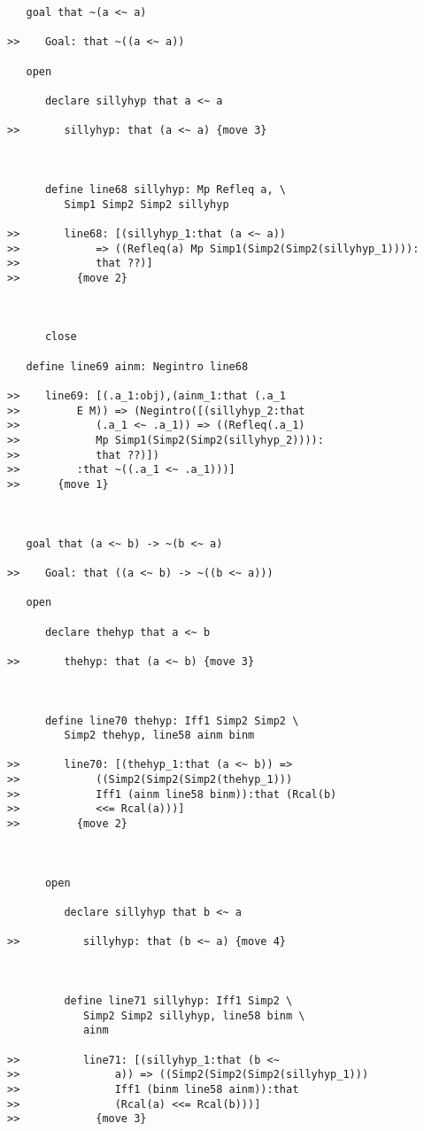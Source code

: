 \documentclass[12pt]{article}
\begin{document}
\begin{verbatim}
   goal that ~(a <~ a)

>>    Goal: that ~((a <~ a))

   open

      declare sillyhyp that a <~ a

>>       sillyhyp: that (a <~ a) {move 3}



      define line68 sillyhyp: Mp Refleq a, \
         Simp1 Simp2 Simp2 sillyhyp

>>       line68: [(sillyhyp_1:that (a <~ a))
>>            => ((Refleq(a) Mp Simp1(Simp2(Simp2(sillyhyp_1)))):
>>            that ??)]
>>         {move 2}



      close

   define line69 ainm: Negintro line68

>>    line69: [(.a_1:obj),(ainm_1:that (.a_1
>>         E M)) => (Negintro([(sillyhyp_2:that
>>            (.a_1 <~ .a_1)) => ((Refleq(.a_1)
>>            Mp Simp1(Simp2(Simp2(sillyhyp_2)))):
>>            that ??)])
>>         :that ~((.a_1 <~ .a_1)))]
>>      {move 1}



   goal that (a <~ b) -> ~(b <~ a)

>>    Goal: that ((a <~ b) -> ~((b <~ a)))

   open

      declare thehyp that a <~ b

>>       thehyp: that (a <~ b) {move 3}



      define line70 thehyp: Iff1 Simp2 Simp2 \
         Simp2 thehyp, line58 ainm binm

>>       line70: [(thehyp_1:that (a <~ b)) =>
>>            ((Simp2(Simp2(Simp2(thehyp_1)))
>>            Iff1 (ainm line58 binm)):that (Rcal(b)
>>            <<= Rcal(a)))]
>>         {move 2}



      open

         declare sillyhyp that b <~ a

>>          sillyhyp: that (b <~ a) {move 4}



         define line71 sillyhyp: Iff1 Simp2 \
            Simp2 Simp2 sillyhyp, line58 binm \
            ainm

>>          line71: [(sillyhyp_1:that (b <~
>>               a)) => ((Simp2(Simp2(Simp2(sillyhyp_1)))
>>               Iff1 (binm line58 ainm)):that
>>               (Rcal(a) <<= Rcal(b)))]
>>            {move 3}




\end{verbatim}
\end{document}
